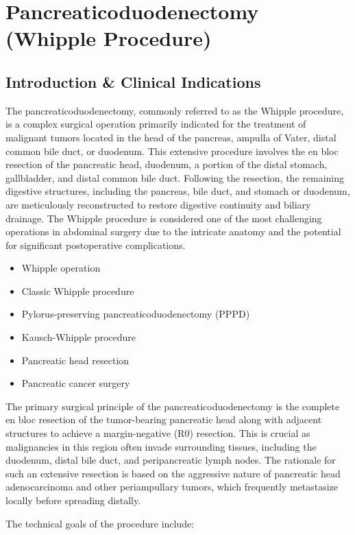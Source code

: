 \chapter{Pancreaticoduodenectomy (Whipple Procedure)}

\section*{Introduction \& Clinical Indications}
The pancreaticoduodenectomy, commonly referred to as the Whipple procedure, is a complex surgical operation primarily indicated for the treatment of malignant tumors located in the head of the pancreas, ampulla of Vater, distal common bile duct, or duodenum. This extensive procedure involves the en bloc resection of the pancreatic head, duodenum, a portion of the distal stomach, gallbladder, and distal common bile duct. Following the resection, the remaining digestive structures, including the pancreas, bile duct, and stomach or duodenum, are meticulously reconstructed to restore digestive continuity and biliary drainage. The Whipple procedure is considered one of the most challenging operations in abdominal surgery due to the intricate anatomy and the potential for significant postoperative complications.

\begin{itemize}
  \item Whipple operation
  \item Classic Whipple procedure
  \item Pylorus-preserving pancreaticoduodenectomy (PPPD)
  \item Kausch-Whipple procedure
  \item Pancreatic head resection
  \item Pancreatic cancer surgery
\end{itemize}

The primary surgical principle of the pancreaticoduodenectomy is the complete en bloc resection of the tumor-bearing pancreatic head along with adjacent structures to achieve a margin-negative (R0) resection. This is crucial as malignancies in this region often invade surrounding tissues, including the duodenum, distal bile duct, and peripancreatic lymph nodes. The rationale for such an extensive resection is based on the aggressive nature of pancreatic head adenocarcinoma and other periampullary tumors, which frequently metastasize locally before spreading distally.

The technical goals of the procedure include:


